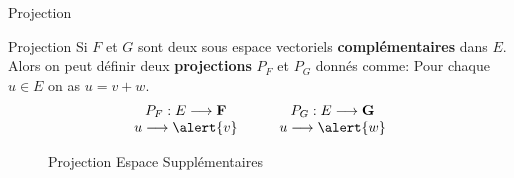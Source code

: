 \documentclass[dvipsnames]{beamer}
\begin{document}
\begin{frame}{Projection}
  \begin{block}{Projection}
    \small
    Si  $F$ et $G$ sont deux sous espace vectoriels \textbf{complémentaires}
    dans $E$. Alors on peut définir deux \textbf{\alert{projections}} $P_F$ et
    $P_G$ donnés comme: Pour chaque $u\in E$ on as $u=v + w$.\\
    \begin{equation}
      \label{eq:central_symmetry}
      \begin{array}{ccc}
        P_F:E \longrightarrow  \mathbf{F} &\quad & P_G : E \longrightarrow
        \mathbf{G} \\
        u   \longrightarrow  \alert{v}  & \quad & u \longrightarrow
        \alert{w}
      \end{array}
    \end{equation}
    \pause
    
  \end{block}

    \begin{figure}[htpb]
    \begin{center}
    \end{center}
    \caption{Projection Espace Supplémentaires}%
    \label{fig:}
    \end{figure}
\end{frame}
\end{document}
